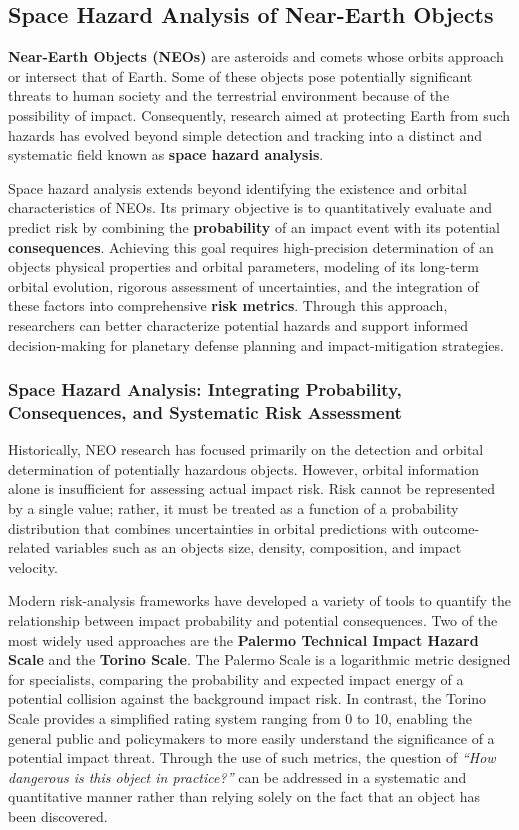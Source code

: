 \subsection{Space Hazard Analysis of Near-Earth Objects}

\textbf{Near-Earth Objects (NEOs)} are asteroids and comets whose orbits approach or intersect that of Earth. Some of these objects pose potentially significant threats to human society and the terrestrial environment because of the possibility of impact. Consequently, research aimed at protecting Earth from such hazards has evolved beyond simple detection and tracking into a distinct and systematic field known as \textbf{space hazard analysis}.

Space hazard analysis extends beyond identifying the existence and orbital characteristics of NEOs. Its primary objective is to quantitatively evaluate and predict risk by combining the \textbf{probability} of an impact event with its potential \textbf{consequences}. Achieving this goal requires high-precision determination of an object\textquotesingle s physical properties and orbital parameters, modeling of its long-term orbital evolution, rigorous assessment of uncertainties, and the integration of these factors into comprehensive \textbf{risk metrics}. Through this approach, researchers can better characterize potential hazards and support informed decision-making for planetary defense planning and impact-mitigation strategies.

\subsubsection{Space Hazard Analysis: Integrating Probability, Consequences, and Systematic Risk Assessment}

Historically, NEO research has focused primarily on the detection and orbital determination of potentially hazardous objects. However, orbital information alone is insufficient for assessing actual impact risk. Risk cannot be represented by a single value; rather, it must be treated as a function of a probability distribution that combines uncertainties in orbital predictions with outcome-related variables such as an object\textquotesingle s size, density, composition, and impact velocity.

Modern risk-analysis frameworks have developed a variety of tools to quantify the relationship between impact probability and potential consequences. Two of the most widely used approaches are the \textbf{Palermo Technical Impact Hazard Scale} and the \textbf{Torino Scale}. The Palermo Scale is a logarithmic metric designed for specialists, comparing the probability and expected impact energy of a potential collision against the background impact risk. In contrast, the Torino Scale provides a simplified rating system ranging from 0 to 10, enabling the general public and policymakers to more easily understand the significance of a potential impact threat. Through the use of such metrics, the question of \emph{``How dangerous is this object in practice?''} can be addressed in a systematic and quantitative manner rather than relying solely on the fact that an object has been discovered.

